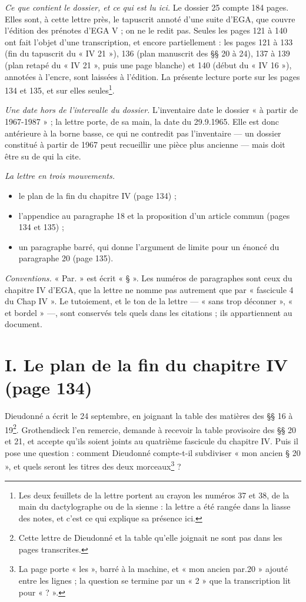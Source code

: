 \documentclass[11pt,a4paper]{article}
\begin{document}
\emph{Ce que contient le dossier, et ce qui est lu ici.} Le dossier 25 compte
184 pages. Elles sont, à cette lettre près, le tapuscrit annoté d'une suite
d'EGA, que couvre l'édition des prénotes d'EGA V ; on ne le redit pas. Seules
les pages 121 à 140 ont fait l'objet d'une transcription, et encore
partiellement : les pages 121 à 133 (fin du tapuscrit du « IV 21 »), 136 (plan
manuscrit des §§ 20 à 24), 137 à 139 (plan retapé du « IV 21 », puis une page
blanche) et 140 (début du « IV 16 »), annotées à l'encre, sont laissées à
l'édition. La présente lecture porte sur les pages 134
et 135, et sur elles seules\footnote{Les deux feuillets de la lettre portent
au crayon les numéros 37 et 38, de la main du dactylographe ou de la sienne :
la lettre a été rangée dans la liasse des notes, et c'est ce qui explique sa
présence ici.}.

\emph{Une date hors de l'intervalle du dossier.} L'inventaire date le dossier
« à partir de 1967-1987 » ; la lettre porte, de sa main, la date du 29.9.1965.
Elle est donc antérieure à la borne basse, ce qui ne contredit pas l'inventaire
— un dossier constitué à partir de 1967 peut recueillir une pièce plus ancienne
— mais doit être su de qui la cite.

\emph{La lettre en trois mouvements.}
\begin{itemize}
  \item le plan de la fin du chapitre IV (page 134) ;
  \item l'appendice au paragraphe 18 et la proposition d'un article commun
  (pages 134 et 135) ;
  \item un paragraphe barré, qui donne l'argument de limite pour un énoncé du
  paragraphe 20 (page 135).
\end{itemize}

\emph{Conventions.} « Par. » est écrit « § ». Les numéros de paragraphes sont
ceux du chapitre IV d'EGA, que la lettre ne nomme pas autrement que par
« fascicule 4 du Chap IV ». Le tutoiement, et le ton de la lettre — « sans trop
déconner », « et bordel » —, sont conservés tels quels dans les citations ; ils
appartiennent au document.

\section*{I. Le plan de la fin du chapitre IV (page 134)}

Dieudonné a écrit le 24 septembre, en joignant la table des matières des
§§ 16 à 19\footnote{Cette lettre de Dieudonné et la table qu'elle joignait ne
sont pas dans les pages transcrites.}. Grothendieck l'en remercie, demande à
recevoir la table provisoire des §§ 20 et 21, et accepte qu'ils soient joints
au quatrième fascicule du chapitre IV. Puis il pose une question : comment
Dieudonné compte-t-il subdiviser « mon ancien § 20 », et quels seront les
titres des deux morceaux\footnote{La page porte « les », barré à la machine, et
« mon ancien par.20 » ajouté entre les lignes ; la question se termine par un
« 2 » que la transcription lit pour « ? ».} ?
\end{document}
